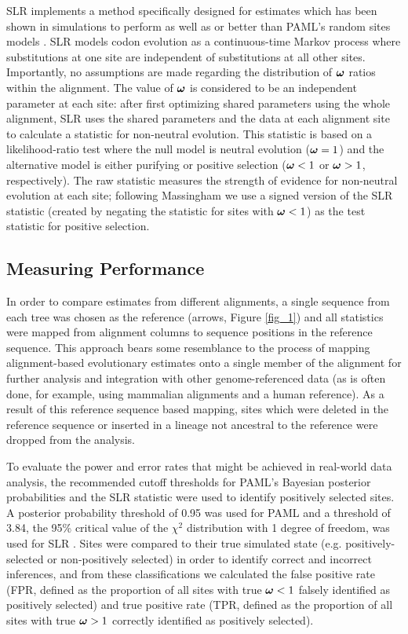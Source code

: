 \documentclass{article}
\begin{document}
SLR implements a method specifically designed for \sw estimates which
has been shown in simulations to perform as well as or better than
PAML's \sw random sites models \citep{Massingham2005Detecting}. SLR
models codon evolution as a continuous-time Markov process where
substitutions at one site are independent of substitutions at all
other sites. Importantly, no assumptions are made regarding the
distribution of $\bm{\omega}$ ratios within the alignment. The value of
$\bm{\omega}$ is considered to be an independent parameter at each site:
after first optimizing shared parameters using the whole alignment,
SLR uses the shared parameters and the data at each alignment site to
calculate a \sw statistic for non-neutral evolution. This statistic is
based on a likelihood-ratio test where the null model is neutral
evolution ($\bm{\omega}=1$) and the alternative model is either purifying or
positive selection ($\bm{\omega}<1$ or $\bm{\omega}>1$, respectively). The raw
statistic measures the strength of evidence for non-neutral evolution
at each site; following Massingham
\citeyearpar{Massingham2005Detecting} we use a signed version of the
SLR statistic (created by negating the statistic for sites with
$\bm{\omega}<1$) as the test statistic for positive selection.

\subsection*{Measuring Performance}

In order to compare \sw estimates from different alignments, a single
sequence from each tree was chosen as the reference (arrows, Figure
\ref{fig_1}) and all \sw statistics were mapped from alignment columns
to sequence positions in the reference sequence. This approach bears
some resemblance to the process of mapping alignment-based
evolutionary estimates onto a single member of the alignment for
further analysis and integration with other genome-referenced data (as
is often done, for example, using mammalian alignments and a human
reference). As a result of this reference sequence based mapping,
sites which were deleted in the reference sequence or inserted in a
lineage not ancestral to the reference were dropped from the analysis.

To evaluate the power and error rates that might be achieved in
real-world data analysis, the recommended cutoff thresholds for PAML’s
Bayesian posterior probabilities and the SLR statistic were used to
identify positively selected sites. A posterior probability threshold
of 0.95 was used for PAML \citep{Yang2005Bayes} and a threshold of 3.84,
the 95\% critical value of the $\chi^2$ distribution with 1 degree
of freedom, was used for SLR \citep{Massingham2005Detecting}. Sites were
compared to their true simulated state (e.g. positively-selected or
non-positively selected) in order to identify correct and incorrect
inferences, and from these classifications we calculated the false
positive rate (FPR, defined as the proportion of all sites with true
$\bm{\omega}<1$ falsely identified as positively selected) and true positive rate
(TPR, defined as the proportion of all sites with true $\bm{\omega}>1$ correctly
identified as positively selected).
\end{document}
